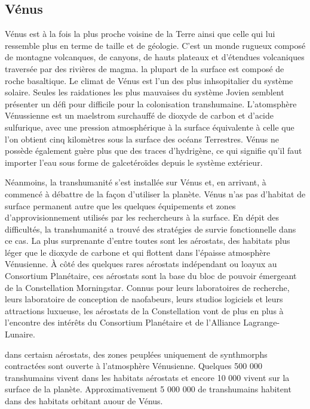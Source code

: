 \subsection{Vénus} \label{sec:venus} 

Vénus est à la fois la plus proche voisine de la Terre ainsi que celle qui lui ressemble plus en terme de taille et de géologie. C'est un monde rugueux composé de montagne volcanques, de canyons, de hauts plateaux et d'étendues volcaniques traversée par des rivières de magma. la plupart de la surface est composé de roche basaltique. Le climat de Vénus est l'un des plus inhsopitalier du système solaire. Seules les raidationes les plus mauvaises du système Jovien semblent présenter un défi pour difficile pour la colonisation transhumaine. L'atomsphère Vénussienne est un maelstrom surchauffé de dioxyde de carbon et d'acide sulfurique, avec une pression atmosphérique à la surface équivalente à celle que l'on obtient cinq kilomètres sous la surface des océans Terrestres. Vénus ne possède également guère plus que des traces d'hydrigène, ce qui signifie qu'il faut importer l'eau sous forme de galcetéroïdes depuis le système extérieur. 

Néanmoins, la transhumanité s'est installée sur Vénus et, en arrivant, à commencé à débattre de la façon d'utiliser la planète. Vénus n'as pas d'habitat de surface permanent autre que les quelques équipements et zones d'approvisionnement utilisés par les rechercheurs à la surface. En dépit des difficultés, la transhumanité a trouvé des stratégies de survie fonctionnelle dans ce cas. La plus surprenante d'entre toutes sont les aérostats, des habitats plus léger que le dioxyde de carbone et qui flottent dans l'épaisse atmosphère Vénusienne. À côté des quelques rares aérostats indépendant ou loayux au  Consortium Planétaire, ces aérostats sont la base du bloc de pouvoir émergeant de la Constellation Morningstar. Connus pour leurs laboratoires de recherche, leurs laboratoire de conception de naofabeurs, leurs studios logiciels et leurs attractions luxueuse, les aérostats de la Constellation vont de plus en plus à l'encontre des intérêts du Consortium Planétaire et de l'Alliance Lagrange-Lunaire. 

dans certaisn aérostats, des zones peuplées uniquement de synthmorphs contractées sont ouverte à l'atmosphère Vénusienne. Quelques 500 000 transhumains vivent dans les habitats aérostats et encore 10 000 vivent sur la surface de la planète. Approximativement 5 000 000 de transhumains habitent dans des habitats orbitant auour de Vénus. 

